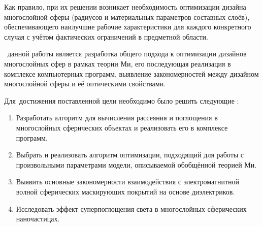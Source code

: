  Как правило, при их решении возникает
необходимость оптимизации дизайна многослойной сферы (радиусов и
материальных параметров составных слоёв), обеспечивающего наилучшие
рабочие характеристики для каждого конкретного случая с учётом
фактических ограничений в предметной области.


\aim\ данной работы является разработка общего подхода к оптимизации
дизайнов многослойных сфер в рамках теории Ми, его последующая
реализация в комплексе компьютерных программ, выявление
закономерностей между дизайном многослойной сферы и её оптическими
свойствами.

Для~достижения поставленной цели необходимо было решить следующие {\tasks}:
\begin{enumerate}
  \item Разработать алгоритм для вычисления рассеяния и поглощения в
    многослойных сферических объектах и реализовать его в комплексе программ.
  \item Выбрать и реализовать алгоритм оптимизации, подходящий для
    работы с произвольными параметрами модели, описываемой обобщённой
    теорией Ми.
  \item Выявить основные закономерности взаимодействия с
    электромагнитной волной сферических маскирующих покрытий на
    основе диэлектриков.
  \item Исследовать эффект суперпоглощения света в многослойных
    сферических наночастицах.
\end{enumerate}



